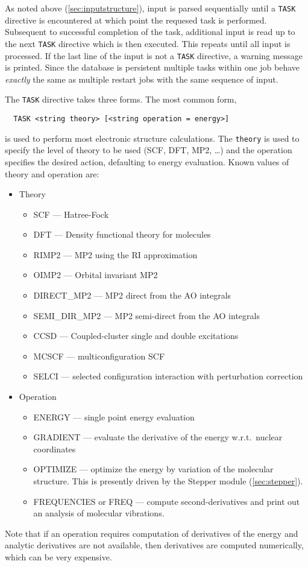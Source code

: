 As noted above (\ref{sec:inputstructure}), input is parsed
sequentially until a \verb+TASK+ directive is encountered at which
point the requesed task is performed.  Subsequent to successful
completion of the task, additional input is read up to the next
\verb+TASK+ directive which is then executed.  This repeats until all
input is processed.  If the last line of the input is not a
\verb+TASK+ directive, a warning message is printed.  Since the
database is persistent multiple tasks within one job behave {\em
  exactly} the same as multiple restart jobs with the same sequence of
input.

The \verb+TASK+ directive takes three forms.  The most common form,
\begin{verbatim}
  TASK <string theory> [<string operation = energy>]
\end{verbatim}
is used to perform most electronic structure calculations.  The
\verb+theory+ is used to specify the level of theory to be used (SCF,
DFT, MP2, \ldots) and the operation specifies the desired action,
defaulting to energy evaluation.  Known values of theory and operation
are:
\begin{itemize}
\item Theory \newline
\begin{itemize}
 \item SCF --- Hatree-Fock
 \item DFT --- Density functional theory for molecules
 \item RIMP2 --- MP2 using the RI approximation
 \item OIMP2 --- Orbital invariant MP2
 \item DIRECT\_MP2 --- MP2 direct from the AO integrals
 \item SEMI\_DIR\_MP2 --- MP2 semi-direct from the AO integrals
 \item CCSD --- Coupled-cluster single and double excitations
 \item MCSCF --- multiconfiguration SCF
 \item SELCI --- selected configuration interaction with perturbation
   correction 
\end{itemize}
\item Operation \newline
\begin{itemize}
 \item ENERGY --- single point energy evaluation
 \item GRADIENT --- evaluate the derivative of the energy w.r.t.\
   nuclear coordinates
 \item OPTIMIZE --- optimize the energy by variation of the molecular
   structure.  This is presently driven by the Stepper module
   (\ref{sec:stepper}). 
 \item FREQUENCIES or FREQ --- compute second-derivatives and print
   out an analysis of molecular vibrations.
\end{itemize} 
\end{itemize}
Note that if an operation requires computation of derivatives of the
energy and analytic derivatives are not available, then derivatives
are computed numerically, which can be very expensive.

